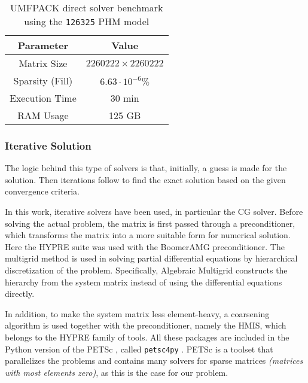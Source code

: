 \begin{table}[!ht]
	\centering
	\caption{\gls{UMFPACK} direct solver benchmark using the \texttt{126325} \gls{PHM} model}
	\label{tab:direct_solver_bench}
	\begin{tabular}{|c|c|}
		\hline
		\rowcolor[HTML]{C0C0C0} 
		\textbf{Parameter} & \textbf{Value} \\ \hline
		Matrix Size & $2260222\times 2260222$ \\ \hline
		Sparsity (Fill) & $6.63\cdot 10^{-6}\%$ \\ \hline
		Execution Time & 30 min \\ \hline
		RAM Usage & 125 GB \\ \hline
	\end{tabular}
\end{table}

\subsubsection{Iterative Solution}
\label{subsec:iterative_solvers}

The logic behind this type of solvers is that, initially, a guess is made for the solution. Then iterations follow to find the exact solution based on the given convergence criteria.

In this work, iterative solvers have been used, in particular the \gls{CG} solver. Before solving the actual problem, the matrix is first passed through a preconditioner, which transforms the matrix into a more suitable form for numerical solution. Here the \gls{HYPRE} \cite{hypre-web-page} suite was used with the Boomer\gls{AMG} \cite[chapter 4]{McCormick1987_amg} preconditioner. The multigrid method is used in solving partial differential equations by hierarchical discretization of the problem. Specifically, Algebraic Multigrid constructs the hierarchy from the system matrix instead of using the differential equations directly. 

In addition, to make the system matrix less element-heavy, a coarsening algorithm is used together with the preconditioner, namely the \gls{HMIS}, which belongs to the \gls{HYPRE} family of tools. All these packages are included in the Python version of the \gls{PETSc} \cite{petsc-web-page,petsc-user-ref,petsc-efficient}, called \texttt{petsc4py} \cite{Dalcin2011}. \gls{PETSc} is a toolset that parallelizes the problems and contains many solvers for sparse matrices \textit{(matrices with most elements zero)}, as this is the case for our problem.

